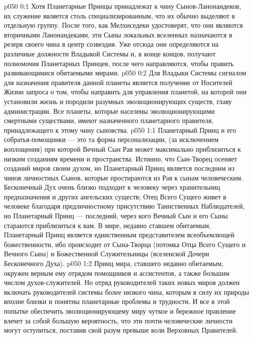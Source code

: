 \author{Вторичный Сын\hyp{}Ланонандек}
\vs p050 0:1 Хотя Планетарные Принцы принадлежат к чину Сынов\hyp{}Ланонандеков, их служение является столь специализированным, что их обычно выделяют в отдельную группу. После того, как Мелхиседеки удостоверят, что они являются вторичными Ланонандеками, эти Сыны локальных вселенных назначаются в резерв своего чина в центр созвездия. Уже отсюда они определяются на различные должности Владыкой Системы и, в конце концов, получают полномочия Планетарных Принцев, после чего направляются, чтобы править развивающимися обитаемыми мирами.
\vs p050 0:2 Для Владыки Системы сигналом для назначения правителя данной планеты является получение от Носителей Жизни запроса о том, чтобы направить для управления планетой, на которой они установили жизнь и породили разумных эволюционирующих существ, главу администрации. Все планеты, которые населены эволюционирующими смертными существами, имеют назначенного планетарного правителя, принадлежащего к этому чину сыновства.
\vs p050 1:1 Планетарный Принц и его собратья\hyp{}помощники --- это та форма персонализации, (за исключением воплощения) при которой Вечный Сын Рая может максимально приблизиться к низким созданиям времени и пространства. Истинно, что Сын\hyp{}Творец осеняет созданий миров своим духом, но Планетарный Принц является последним из чинов личностных Сынов, которые простираются из Рая к сынам человеческим. Бесконечный Дух очень близко подходит к человеку через хранительниц предназначения и других ангельских существ; Отец Всего Сущего живет в человеке благодаря предличностному присутствию Таинственных Наблюдателей, но Планетарный Принц --- последний, через кого Вечный Сын и его Сыны стараются приблизиться к вам. В мире, недавно ставшем обитаемым, Планетарный Принц является единственным представителем всеобъемлющей божественности, ибо происходит от Сына\hyp{}Творца (потомка Отца Всего Сущего и Вечного Сына) и Божественной Служительницы (вселенской Дочери Бесконечного Духа).
\vs p050 1:2 Принц мира, ставшего недавно обитаемым, окружен верным ему отрядом помощников и ассистентов, а также большим числом духов\hyp{}служителей. Но отряд руководителей таких новых миров должен включать руководителей системы более низкого чина, которым в силу их природы вполне близки и понятны планетарные проблемы и трудности. И все в этой попытке обеспечить эволюционирующему миру чуткое и бережное правление влечет за собой большую вероятность, что эти почти\hyp{}человеческие личности могут оступиться, поставив свой разум превыше воли Верховных Правителей.

